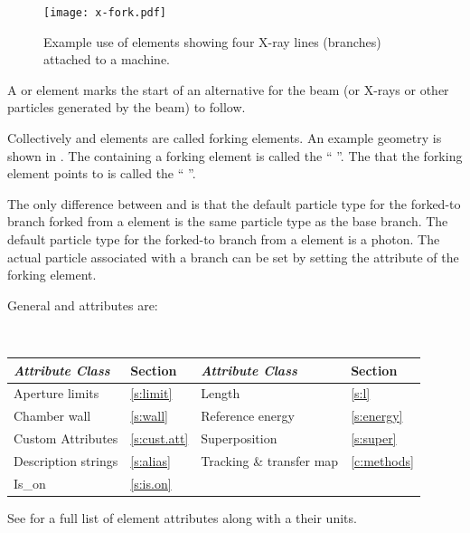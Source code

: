 \begin{figure}[tb]
  \centering
  \texttt{[image: x-fork.pdf]}
  \caption[Example with photon_fork elements.]
  {
Example use of  elements showing four X-ray lines (branches) attached to a machine.
  }
  \label{f:x.fork}
\end{figure}

A  or  element marks the start of an alternative  for the beam
(or X-rays or other particles generated by the beam) to follow.

Collectively  and  elements are called forking elements. An example
geometry is shown in .  The  containing a forking element is called the
`` ''. The  that the forking element points to is called the
`` ''.

The only difference between  and  is that the default particle type for the
forked-to branch forked from a  element is the same particle type as the base branch. The
default particle type for the forked-to branch from a  element is a photon. The actual
particle associated with a branch can be set by setting the  attribute of the forking
element.

General  and  attributes are:
\begin{center}
\tt
\begin{tabular}{llll} \toprule
  {\sl Attribute Class}      & Section           & {\sl Attribute Class}      & Section         \\ \midrule
  Aperture limits            & \ref{s:limit}     & Length                     & \ref{s:l}       \\
  Chamber wall               & \ref{s:wall}      & Reference energy           & \ref{s:energy}  \\ 
  Custom Attributes          & \ref{s:cust.att}  & Superposition              & \ref{s:super}   \\
  Description strings        & \ref{s:alias}     & Tracking \& transfer map   & \ref{c:methods} \\ 
  Is_on                      & \ref{s:is.on}     &                            &                 \\
  \bottomrule
\end{tabular}
\end{center}
\toffset
See  for a full list of element attributes along with a their units.

